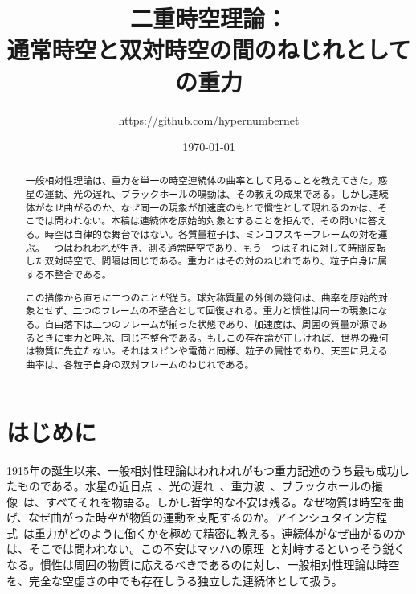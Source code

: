 \documentclass[a4paper]{article}
\title{二重時空理論：\\通常時空と双対時空の間のねじれとしての重力}
\author{https://github.com/hypernumbernet}
\date{\today}
\begin{document}
\maketitle

\begin{abstract}
一般相対性理論は、重力を単一の時空連続体の曲率として見ることを教えてきた。惑星の運動、光の遅れ、ブラックホールの鳴動は、その教えの成果である。しかし連続体がなぜ曲がるのか、なぜ同一の現象が加速度のもとで慣性として現れるのかは、そこでは問われない。本稿は連続体を原始的対象とすることを拒んで、その問いに答える。時空は自律的な舞台ではない。各質量粒子は、ミンコフスキーフレームの対を運ぶ。一つはわれわれが生き、測る通常時空であり、もう一つはそれに対して時間反転した双対時空で、間隔は同じである。重力とはその対のねじれであり、粒子自身に属する不整合である。

この描像から直ちに二つのことが従う。球対称質量の外側の幾何は、曲率を原始的対象とせず、二つのフレームの不整合として回復される。重力と慣性は同一の現象になる。自由落下は二つのフレームが揃った状態であり、加速度は、周囲の質量が源であるときに重力と呼ぶ、同じ不整合である。もしこの存在論が正しければ、世界の幾何は物質に先立たない。それはスピンや電荷と同様、粒子の属性であり、天空に見える曲率は、各粒子自身の双対フレームのねじれである。
\end{abstract}

\section{はじめに}
\label{sec:introduction}

1915年の誕生以来、一般相対性理論はわれわれがもつ重力記述のうち最も成功したものである。水星の近日点~\cite{einstein1915}、光の遅れ~\cite{shapiro1964}、重力波~\cite{abbott2016}、ブラックホールの撮像~\cite{eht2019}は、すべてそれを物語る。しかし哲学的な不安は残る。なぜ物質は時空を曲げ、なぜ曲がった時空が物質の運動を支配するのか。アインシュタイン方程式~\cite{einstein1916}は重力がどのように働くかを極めて精密に教える。連続体がなぜ曲がるのかは、そこでは問われない。この不安はマッハの原理~\cite{mach1883}と対峙するといっそう鋭くなる。慣性は周囲の物質に応えるべきであるのに対し、一般相対性理論は時空を、完全な空虚さの中でも存在しうる独立した連続体として扱う。
\end{document}
